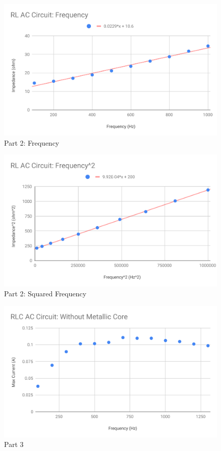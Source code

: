\begin{figure}[ht]
	\centering
	\includegraphics[scale=0.74]{image/06-RLC/part-2-f.pdf}
	\caption{Part 2: Frequency}
	\label{figure.06.part.2.f}
\end{figure}
\begin{figure}[ht]
	\centering
	\includegraphics[scale=0.74]{image/06-RLC/part-2-f2.pdf}
	\caption{Part 2: Squared Frequency}
	\label{figure.06.part.2.f2}
\end{figure}
\begin{figure}[ht]
	\centering
	\includegraphics[scale=0.74]{image/06-RLC/part-3.pdf}
	\caption{Part 3}
	\label{figure.06.part.3.f}
\end{figure}
